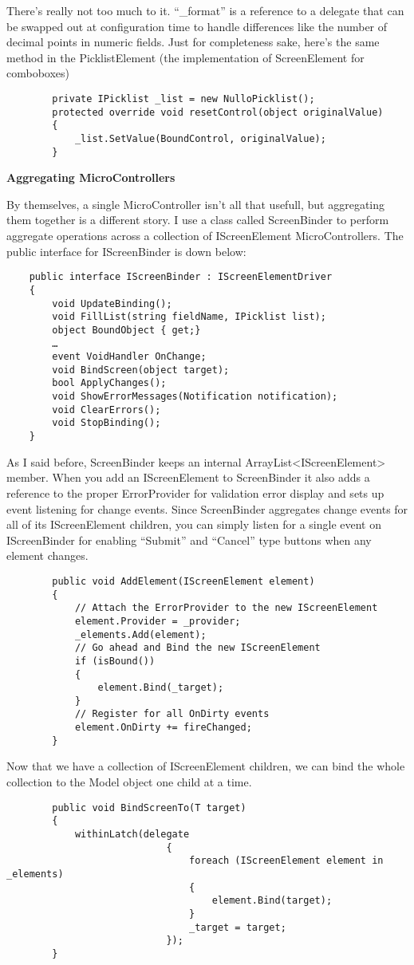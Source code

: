 \documentclass{article}
\begin{document}
{There's really not too much to it.  “\_format” is a reference to a delegate that can be swapped out at configuration time to handle differences like the number of decimal points in numeric fields.  Just for completeness sake, here's the same method in the PicklistElement (the implementation of ScreenElement for comboboxes) 
\begin{lstlisting}
        private IPicklist _list = new NulloPicklist();
        protected override void resetControl(object originalValue)
        {
    		_list.SetValue(BoundControl, originalValue);
        }
\end{lstlisting}
\newpage
\Large {\textbf{Aggregating MicroControllers}}

By themselves, a single MicroController isn't all that usefull, but aggregating them together is a different story.  I use a class called ScreenBinder to perform aggregate operations across a collection of IScreenElement MicroControllers.  The public interface for IScreenBinder is down below:

\begin{lstlisting}
    public interface IScreenBinder : IScreenElementDriver
    {
        void UpdateBinding();
        void FillList(string fieldName, IPicklist list);
        object BoundObject { get;}
        …
        event VoidHandler OnChange;
        void BindScreen(object target);
        bool ApplyChanges();
        void ShowErrorMessages(Notification notification);
        void ClearErrors();
        void StopBinding();
    }
\end{lstlisting}

As I said before, ScreenBinder keeps an internal ArrayList<IScreenElement> member.  When you add an IScreenElement to ScreenBinder it also adds a reference to the proper ErrorProvider for validation error display and sets up event listening for change events.  Since ScreenBinder aggregates change events for all of its IScreenElement children, you can simply listen for a single event on IScreenBinder for enabling “Submit” and “Cancel” type buttons when any element changes.
 \begin{lstlisting}
        public void AddElement(IScreenElement element)
        {
            // Attach the ErrorProvider to the new IScreenElement
            element.Provider = _provider;
            _elements.Add(element);
            // Go ahead and Bind the new IScreenElement
            if (isBound())
            {
                element.Bind(_target);
            }
            // Register for all OnDirty events
            element.OnDirty += fireChanged;
        }
\end{lstlisting}
Now that we have a collection of IScreenElement children, we can bind the whole collection to the Model object one child at a time.
\begin{lstlisting}
        public void BindScreenTo(T target)
        {
            withinLatch(delegate
                            {
                                foreach (IScreenElement element in _elements)
                                {
                                    element.Bind(target);
                                }
                                _target = target;
                            });
        } 


\end{lstlisting}}
\end{document}
